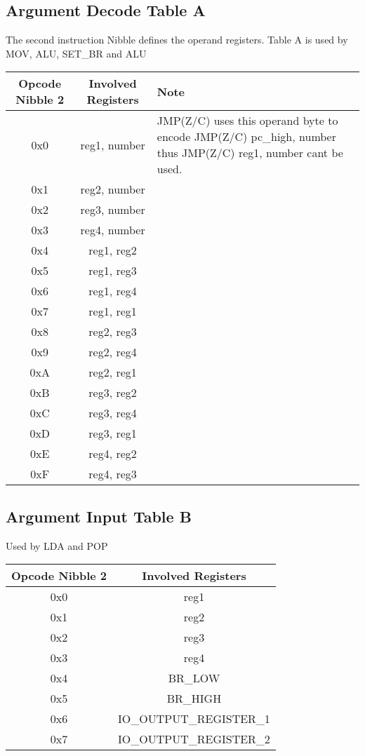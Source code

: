 \documentclass[a4paper, 12pt]{article}
\begin{document}
	\subsection{Argument Decode Table A}
 The second instruction Nibble defines the operand registers.
Table A is used by MOV, ALU, SET\_BR and ALU
	\begin{center}
		\begin{tabular}{|c|c|p{6cm}|}
			\hline
			Opcode Nibble 2 & Involved Registers & Note \\ \hline
			0x0 & reg1, number &JMP(Z/C) uses this operand byte to encode 
JMP(Z/C) pc\_high, number
thus JMP(Z/C) reg1, number cant be used. \\ \hline
			0x1 & reg2, number & \\ \hline
			0x2 & reg3, number & \\ \hline
			0x3 & reg4, number & \\ \hline
			0x4 & reg1, reg2 & \\ \hline
			0x5 & reg1, reg3 & \\ \hline
			0x6 & reg1, reg4 & \\ \hline
			0x7 & reg1, reg1 & \\ \hline
			0x8 & reg2, reg3 & \\ \hline
			0x9 & reg2, reg4 & \\ \hline
			0xA & reg2, reg1 & \\ \hline
			0xB & reg3, reg2 & \\ \hline
			0xC & reg3, reg4 & \\ \hline
			0xD & reg3, reg1 & \\ \hline
			0xE & reg4, reg2 & \\ \hline
			0xF & reg4, reg3 & \\ \hline
		\end{tabular}
	\end{center}	
	\newpage
	\subsection{Argument Input Table B}
	Used by LDA and POP
	\begin{center}
		\begin{tabular}{|c|c|}
			\hline
			Opcode Nibble 2 & Involved Registers \\ \hline
			0x0 & reg1 \\ \hline
			0x1 & reg2 \\ \hline
			0x2 & reg3 \\ \hline
			0x3 & reg4 \\ \hline
			0x4 & BR\_LOW \\ \hline
			0x5 & BR\_HIGH \\ \hline
			0x6 & IO\_OUTPUT\_REGISTER\_1 \\ \hline
			0x7 & IO\_OUTPUT\_REGISTER\_2 \\ \hline
		\end{tabular}
	\end{center}	
\end{document}
